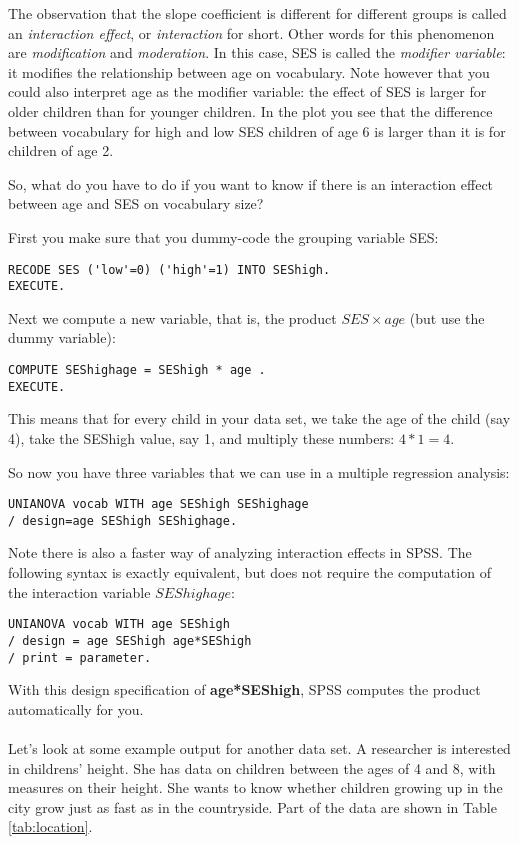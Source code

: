 The observation that the slope coefficient is different for different groups is called an \textit{interaction effect}, or \textit{interaction} for short. Other words for this phenomenon are \textit{modification} and \textit{moderation}. In this case, SES is called the \textit{modifier variable}: it modifies the relationship between age on vocabulary. Note however that you could also interpret age as the modifier variable: the effect of SES is larger for older children than for younger children. In the plot you see that the difference between vocabulary for high and low SES children of age 6 is larger than it is for children of age 2.

So, what do you have to do if you want to know if there is an interaction effect between age and SES on vocabulary size? 

First you make sure that you dummy-code the grouping variable SES: 


\begin{verbatim}
RECODE SES ('low'=0) ('high'=1) INTO SEShigh.
EXECUTE.
\end{verbatim}

Next we compute a new variable, that is, the product $SES \times age$ (but use the dummy variable):


\begin{verbatim}
COMPUTE SEShighage = SEShigh * age .
EXECUTE.
\end{verbatim}

This means that for every child in your data set, we take the age of the child (say 4), take the SEShigh value, say 1, and multiply these numbers: $4*1=4$.


So now you have three variables that we can use in a multiple regression analysis:

\begin{verbatim}
UNIANOVA vocab WITH age SEShigh SEShighage
/ design=age SEShigh SEShighage.
\end{verbatim}


Note there is also a faster way of analyzing interaction effects in SPSS. The following syntax is exactly equivalent, but does not require the computation of the interaction variable $SEShighage$:

\begin{verbatim}
UNIANOVA vocab WITH age SEShigh 
/ design = age SEShigh age*SEShigh
/ print = parameter.
\end{verbatim}

With this design specification of \textbf{age*SEShigh}, SPSS computes the product automatically for you.
\\
\\
Let's look at some example output for another data set. A researcher is interested in childrens' height. She has data on children between the ages of 4 and 8, with measures on their height. She wants to know whether children growing up in the city grow just as fast as in the countryside. Part of the data are shown in Table \ref{tab:location}.
 
